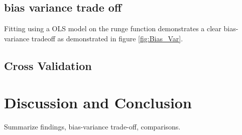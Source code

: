 \documentclass[
 reprint,            %
 amsmath,amssymb,
 aps,
]{revtex4-2}
\begin{document}




\subsection{bias variance trade off}
Fitting using a OLS model on the runge function demonstrates a clear bias-variance tradeoff as demonstrated in figure \ref{fig:Bias_Var}.



\subsection{Cross Validation}


\section{Discussion and Conclusion}
Summarize findings, bias-variance trade-off, comparisons.


\end{document}
